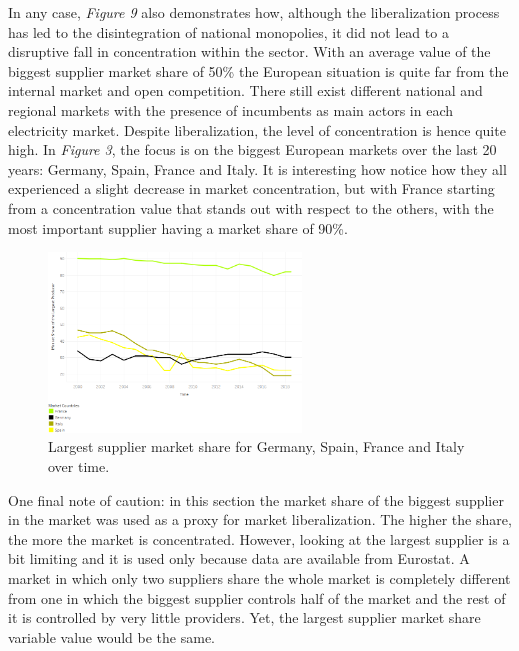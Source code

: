\documentclass{book}
\begin{document}
In any case, \textit{Figure 9} also demonstrates how, although the liberalization process has led to the disintegration of national monopolies, it did not lead to a disruptive fall in concentration within the sector. With an average value of the biggest  supplier market share of 50\% the European situation is quite far from the internal market and open competition. There still exist different national and regional markets with the presence of incumbents as main actors in each electricity market. Despite liberalization, the level of concentration is hence quite high.  In \textit{Figure 3}, the focus is on the biggest European markets over the last 20 years: Germany, Spain, France and Italy. It is interesting how notice how they all experienced a slight decrease in market concentration, but with France starting from a concentration value that stands out with respect to the others, with the most important supplier having a market share of 90\%.

\bigskip
\begin{figure}[H]
\begin{center}
\captionsetup{justification=centering}
\includegraphics[width=0.6\textwidth]{Images/conc-mc.png}
\caption{Largest supplier market share for Germany, Spain, France and Italy over time. }
\end{center}
\end{figure}
\bigskip

One final note of caution: in this section the market share of the biggest supplier in the market was used as a proxy for market liberalization. The higher the share, the more the market is concentrated. However, looking at the largest supplier is a bit limiting and it is used only because data are available from Eurostat. A market in which only two suppliers share the whole market is completely different from one in which the biggest supplier controls half of the market and the rest of it is controlled by very little providers. Yet, the largest supplier market share variable value would be the same.
\end{document}
